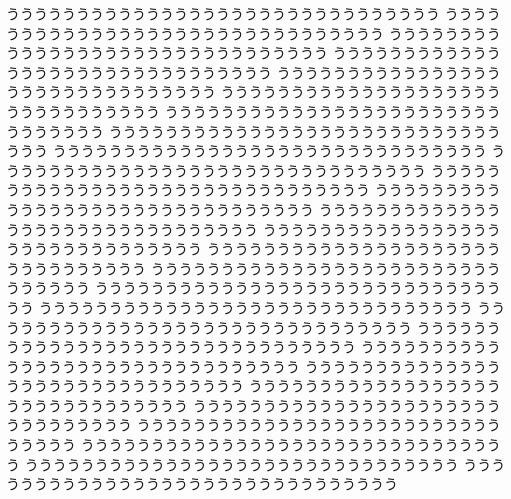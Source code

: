 \begin{breakLline}[fboxsep=10pt]
ううううううううううううううううううううううううううううううう
ううううううううううううううううううううううううううううううう
ううううううううううううううううううううううううううううううう
ううううううううううううううううううううううううううううううう
ううううううううううううううううううううううううううううううう
ううううううううううううううううううううううううううううううう
ううううううううううううううううううううううううううううううう
ううううううううううううううううううううううううううううううう
ううううううううううううううううううううううううううううううう
ううううううううううううううううううううううううううううううう
ううううううううううううううううううううううううううううううう
ううううううううううううううううううううううううううううううう
ううううううううううううううううううううううううううううううう
ううううううううううううううううううううううううううううううう
ううううううううううううううううううううううううううううううう
ううううううううううううううううううううううううううううううう
ううううううううううううううううううううううううううううううう
ううううううううううううううううううううううううううううううう
ううううううううううううううううううううううううううううううう
ううううううううううううううううううううううううううううううう
ううううううううううううううううううううううううううううううう
ううううううううううううううううううううううううううううううう
ううううううううううううううううううううううううううううううう
ううううううううううううううううううううううううううううううう
ううううううううううううううううううううううううううううううう
ううううううううううううううううううううううううううううううう
ううううううううううううううううううううううううううううううう
ううううううううううううううううううううううううううううううう
\end{breakLline}
